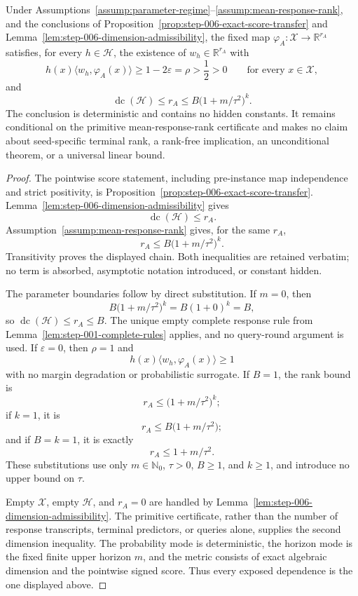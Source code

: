 \begin{proposition}
\label{prop:step-006-polynomial-closure}
Under Assumptions~\ref{assump:parameter-regime}--\ref{assump:mean-response-rank},
and the conclusions of
Proposition~\ref{prop:step-006-exact-score-transfer} and
Lemma~\ref{lem:step-006-dimension-admissibility}, the fixed map
\(\varphi_A:\mathcal X\to\mathbb R^{r_A}\) satisfies, for every
\(h\in\mathcal H\), the existence of \(w_h\in\mathbb R^{r_A}\) with
\[
h(x)\langle w_h,\varphi_A(x)\rangle
\ge1-2\varepsilon=\rho>\frac12>0
\qquad\text{for every }x\in\mathcal X,
\]
and
\[
\operatorname{dc}(\mathcal H)
\le r_A
\le B\bigl(1+m/\tau^2\bigr)^k.
\]
The conclusion is deterministic and contains no hidden constants.  It remains
conditional on the primitive mean-response-rank certificate and makes no
claim about seed-specific terminal rank, a rank-free implication, an
unconditional theorem, or a universal linear bound.
\end{proposition}

\begin{proof}
The pointwise score statement, including pre-instance map independence and
strict positivity, is Proposition~\ref{prop:step-006-exact-score-transfer}.
Lemma~\ref{lem:step-006-dimension-admissibility} gives
\[
\operatorname{dc}(\mathcal H)\le r_A.
\]
Assumption~\ref{assump:mean-response-rank} gives, for the same \(r_A\),
\[
r_A\le B\bigl(1+m/\tau^2\bigr)^k.
\]
Transitivity proves the displayed chain.  Both inequalities are retained
verbatim; no term is absorbed, asymptotic notation introduced, or constant
hidden.

The parameter boundaries follow by direct substitution.  If \(m=0\), then
\[
B\bigl(1+m/\tau^2\bigr)^k=B(1+0)^k=B,
\]
so \(\operatorname{dc}(\mathcal H)\le r_A\le B\).  The unique empty complete
response rule from Lemma~\ref{lem:step-001-complete-rules} applies, and no
query-round argument is used.  If \(\varepsilon=0\), then \(\rho=1\) and
\[
h(x)\langle w_h,\varphi_A(x)\rangle\ge1
\]
with no margin degradation or probabilistic surrogate.  If \(B=1\), the
rank bound is
\[
r_A\le\bigl(1+m/\tau^2\bigr)^k;
\]
if \(k=1\), it is
\[
r_A\le B\bigl(1+m/\tau^2\bigr);
\]
and if \(B=k=1\), it is exactly
\[
r_A\le1+m/\tau^2.
\]
These substitutions use only \(m\in\mathbb N_0\), \(\tau>0\), \(B\ge1\),
and \(k\ge1\), and introduce no upper bound on \(\tau\).

Empty \(\mathcal X\), empty \(\mathcal H\), and \(r_A=0\) are handled by
Lemma~\ref{lem:step-006-dimension-admissibility}.  The primitive certificate,
rather than the number of response transcripts, terminal predictors, or
queries alone, supplies the second dimension inequality.  The probability
mode is deterministic, the horizon mode is the fixed finite upper horizon
\(m\), and the metric consists of exact algebraic dimension and the pointwise
signed score.  Thus every exposed dependence is the one displayed above.
\end{proof}

